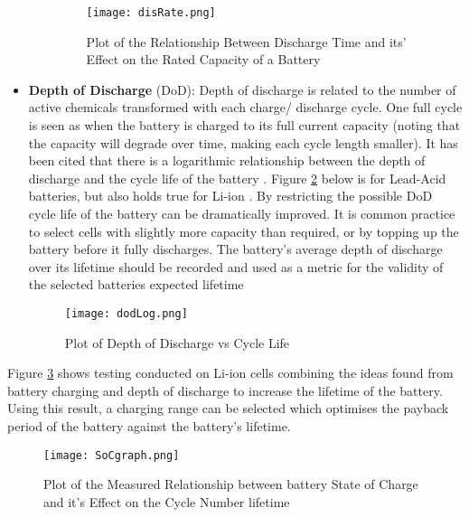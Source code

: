 \begin{itemize}
\begin{itemize}
    \begin{figure}[H]
       \centering
       \texttt{[image: disRate.png]}
       \caption{Plot of the Relationship Between Discharge Time and its' Effect on the Rated Capacity of a Battery \cite{Effectso69:online}}
       \label{disRate}
     \end{figure}
  \end{itemize}
\item
  \textbf{Depth of Discharge} (DoD): Depth of discharge is related to
  the number of active chemicals transformed with each charge/ discharge
  cycle. One full cycle is seen as when the battery is charged to its
  full current capacity (noting that the capacity will degrade over
  time, making each cycle length smaller). It has been cited that there
  is a logarithmic relationship between the depth of discharge and the
  cycle life of the battery \cite{BatteryL10:online}. Figure
  \ref{dodLog} below is for Lead-Acid batteries, but also holds true for
  Li-ion \cite{BatteryL10:online}. By restricting the possible DoD cycle
  life of the battery can be dramatically improved. It is common
  practice to select cells with slightly more capacity than required, or
  by topping up the battery before it fully discharges. The battery's
  average depth of discharge over its lifetime should be recorded and
  used as a metric for the validity of the selected batteries expected
  lifetime

  \begin{figure}[H]
    \centering
    \texttt{[image: dodLog.png]}
    \caption{Plot of Depth of Discharge vs Cycle Life \cite{BatteryL10:online}}
    \label{dodLog}
  \end{figure}
\end{itemize}

Figure \ref{SoCgraph} shows testing conducted on Li-ion cells combining
the ideas found from battery charging and depth of discharge to increase
the lifetime of the battery. Using this result, a charging range can be
selected which optimises the payback period of the battery against the
battery's lifetime.

\begin{figure}[H]
    \centering
    \texttt{[image: SoCgraph.png]}
    \caption{Plot of the Measured  Relationship between battery State of Charge and it's Effect on the Cycle Number lifetime \cite{xu2016modeling}}
    \label{SoCgraph}
  \end{figure}

